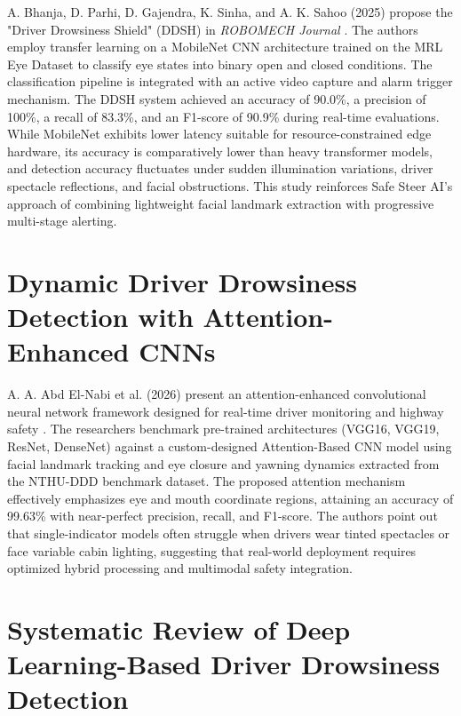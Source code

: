 \documentclass[a4paper,12pt]{report}
\begin{document}
\hspace{1cm}A. Bhanja, D. Parhi, D. Gajendra, K. Sinha, and A. K. Sahoo (2025) propose the "Driver Drowsiness Shield" (DDSH) in \textit{ROBOMECH Journal} \cite{ref_ddsh}. The authors employ transfer learning on a MobileNet CNN architecture trained on the MRL Eye Dataset to classify eye states into binary open and closed conditions. The classification pipeline is integrated with an active video capture and alarm trigger mechanism. The DDSH system achieved an accuracy of 90.0\%, a precision of 100\%, a recall of 83.3\%, and an F1-score of 90.9\% during real-time evaluations. While MobileNet exhibits lower latency suitable for resource-constrained edge hardware, its accuracy is comparatively lower than heavy transformer models, and detection accuracy fluctuates under sudden illumination variations, driver spectacle reflections, and facial obstructions. This study reinforces Safe Steer AI's approach of combining lightweight facial landmark extraction with progressive multi-stage alerting.

\section{Dynamic Driver Drowsiness Detection with Attention-Enhanced CNNs}

\hspace{1cm}A. A. Abd El-Nabi et al. (2026) present an attention-enhanced convolutional neural network framework designed for real-time driver monitoring and highway safety \cite{ref_attention_cnn}. The researchers benchmark pre-trained architectures (VGG16, VGG19, ResNet, DenseNet) against a custom-designed Attention-Based CNN model using facial landmark tracking and eye closure and yawning dynamics extracted from the NTHU-DDD benchmark dataset. The proposed attention mechanism effectively emphasizes eye and mouth coordinate regions, attaining an accuracy of 99.63\% with near-perfect precision, recall, and F1-score. The authors point out that single-indicator models often struggle when drivers wear tinted spectacles or face variable cabin lighting, suggesting that real-world deployment requires optimized hybrid processing and multimodal safety integration.

\section{Systematic Review of Deep Learning-Based Driver Drowsiness Detection}
\end{document}
